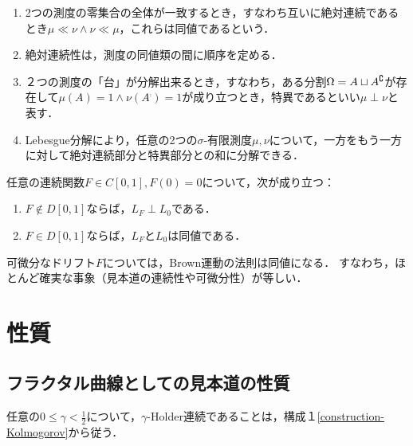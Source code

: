 \documentclass[uplatex,dvipdfmx]{jsreport}
\begin{document}
\begin{definition}\mbox{}
    \begin{enumerate}
        \item 2つの測度の零集合の全体が一致するとき，すなわち互いに絶対連続であるとき$\mu\ll\nu\land\nu\ll\mu$，これらは同値であるという．
        \item 絶対連続性は，測度の同値類の間に順序を定める．
        \item ２つの測度の「台」が分解出来るとき，すなわち，ある分割$\Omega=A\sqcup A^\complement$が存在して$\mu(A)=1\land\nu(A^\comp)=1$が成り立つとき，特異であるといい$\mu\perp\nu$と表す．
        \item Lebesgue分解により，任意の2つの$\sigma$-有限測度$\mu,\nu$について，一方をもう一方に対して絶対連続部分と特異部分との和に分解できる．
    \end{enumerate}
\end{definition}

\begin{theorem}
    任意の連続関数$F\in C[0,1],F(0)=0$について，次が成り立つ：
    \begin{enumerate}
        \item $F\notin D[0,1]$ならば，$L_F\perp L_0$である．
        \item $F\in D[0,1]$ならば，$L_F$と$L_0$は同値である．
    \end{enumerate}
\end{theorem}
\begin{remarks}
    可微分なドリフト$F$については，Brown運動の法則は同値になる．
    すなわち，ほとんど確実な事象（見本道の連続性や可微分性）が等しい．
\end{remarks}

\section{性質}

\subsection{フラクタル曲線としての見本道の性質}

\begin{tcolorbox}[colframe=ForestGreen, colback=ForestGreen!10!white,breakable,colbacktitle=ForestGreen!40!white,coltitle=black,fonttitle=\bfseries\sffamily,
title=]
    任意の$0\le\gamma<\frac{1}{2}$について，$\gamma$-Holder連続であることは，構成１\ref{construction-Kolmogorov}から従う．
\end{tcolorbox}
\end{document}
